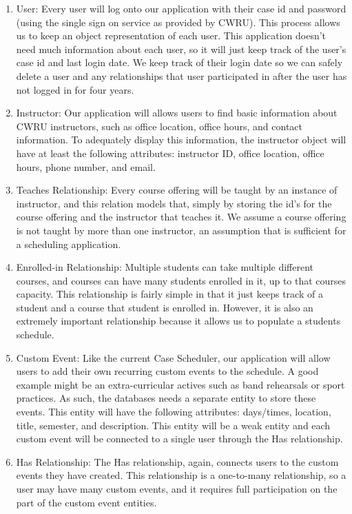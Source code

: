 \documentclass[pdftex,12pt,letter]{article}
\begin{document}
\begin{enumerate}[1.]
\item User: Every user will log onto our application with their case id and password (using the single sign on service as provided by CWRU). This process allows us to keep an object representation of each user. This application doesn't need much information about each user, so it will just keep track of the user's case id and last login date. We keep track of their login date so we can safely delete a user and any relationships that user participated in after the user has not logged in for four years.
\item Instructor: Our application will allows users to find basic information about CWRU instructors, such as office location, office hours, and contact information. To adequately display this information, the instructor object will have at least the following attributes: instructor ID, office location, office hours, phone number, and email.
\item Teaches Relationship: Every course offering will be taught by an instance of instructor, and this relation models that, simply by storing the id's for the course offering and the instructor that teaches it. We assume a course offering is not taught by more than one instructor, an assumption that is sufficient for a scheduling application.
\item Enrolled-in Relationship: Multiple students can take multiple different courses, and courses can have many students enrolled in it, up to that courses capacity. This relationship is fairly simple in that it just keeps track of a student and a course that student is enrolled in. However, it is also an extremely important relationship because it allows us to populate a students schedule.
\item Custom Event: Like the current Case Scheduler, our application will allow users to add their own recurring custom events to the schedule. A good example might be an extra-curricular actives such as band rehearsals or sport practices. As such, the databases needs a separate entity to store these events. This entity will have the following attributes: days/times, location, title, semester, and description. This entity will be a weak entity and each custom event will be connected to a single user through the Has relationship.
\item Has Relationship: The Has relationship, again, connects users to the custom events they have created. This relationship is a one-to-many relationship, so a user may have many custom events, and it requires full participation on the part of the custom event entities.
\end{enumerate}
\end{document}
